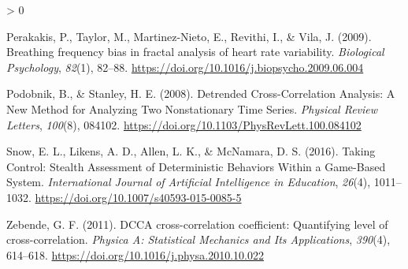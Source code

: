 \documentclass[
  english,
  man]{apa6}
\newlength{\cslhangindent}
\newenvironment{CSLReferences}[2] %
 {%
  \setlength{\parindent}{0pt}
  \ifodd #1 \everypar{\setlength{\hangindent}{\cslhangindent}}\ignorespaces\fi
  \ifnum #2 > 0
  \setlength{\parskip}{#2\baselineskip}
  \fi
 }%
 {}
\begin{document}
\begin{CSLReferences}{1}{0}
\leavevmode\hypertarget{ref-perakakis2009}{}%
Perakakis, P., Taylor, M., Martinez-Nieto, E., Revithi, I., \& Vila, J. (2009). Breathing frequency bias in fractal analysis of heart rate variability. \emph{Biological Psychology}, \emph{82}(1), 82--88. \url{https://doi.org/10.1016/j.biopsycho.2009.06.004}

\leavevmode\hypertarget{ref-podobnikDetrendedCrossCorrelationAnalysis2008}{}%
Podobnik, B., \& Stanley, H. E. (2008). Detrended {Cross}-{Correlation} {Analysis}: {A} {New} {Method} for {Analyzing} {Two} {Nonstationary} {Time} {Series}. \emph{Physical Review Letters}, \emph{100}(8), 084102. \url{https://doi.org/10.1103/PhysRevLett.100.084102}

\leavevmode\hypertarget{ref-snow2016}{}%
Snow, E. L., Likens, A. D., Allen, L. K., \& McNamara, D. S. (2016). Taking Control: Stealth Assessment of Deterministic Behaviors Within a Game-Based System. \emph{International Journal of Artificial Intelligence in Education}, \emph{26}(4), 1011--1032. \url{https://doi.org/10.1007/s40593-015-0085-5}

\leavevmode\hypertarget{ref-zebendeDCCACrosscorrelationCoefficient2011}{}%
Zebende, G. F. (2011). {DCCA} cross-correlation coefficient: {Quantifying} level of cross-correlation. \emph{Physica A: Statistical Mechanics and Its Applications}, \emph{390}(4), 614--618. \url{https://doi.org/10.1016/j.physa.2010.10.022}

\end{CSLReferences}

\endgroup
\end{document}
